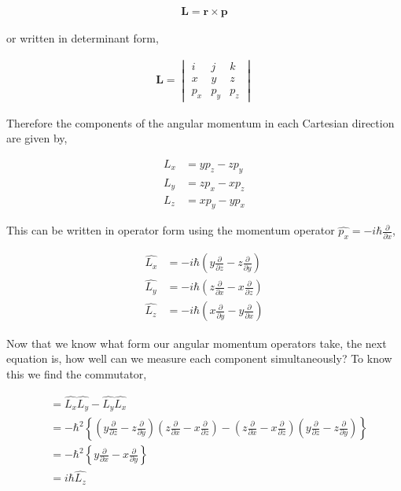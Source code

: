 \documentclass[11pt]{amsart}
\begin{document}
\begin{align*}
  \mathbf{L} = \mathbf{r}\times\mathbf{p}
\end{align*}

or written in determinant form,

\begin{align*}
  \mathbf{L} =
  \begin{vmatrix}
    i & j & k \\
    x & y & z \\
    p_x & p_y & p_z
  \end{vmatrix}
\end{align*}

Therefore the components of the angular momentum in each Cartesian direction are given by,

\begin{align*}
  L_x &= yp_z - zp_y \\
  L_y &= zp_x - xp_z \\
  L_z &= xp_y - yp_x
\end{align*}

This can be written in operator form using the momentum operator $\hat{p_x} = -i\hbar\frac{\partial}{\partial x}$,

\begin{align*}
  \hat{L_x} &= -i\hbar\left(y\frac{\partial}{\partial z}-z\frac{\partial}{\partial y}\right) \\
  \hat{L_y} &= -i\hbar\left(z\frac{\partial}{\partial x}-x\frac{\partial}{\partial z}\right) \\
  \hat{L_z} &= -i\hbar\left(x\frac{\partial}{\partial y}-y\frac{\partial}{\partial x}\right)
\end{align*}

Now that we know what form our angular momentum operators take, the next equation is, how well can we measure each component simultaneously? To know this we find the commutator,

\begin{align*}
  [\hat{L_x}, \hat{L_y}] &= \hat{L_x}\hat{L_y} - \hat{L_y}\hat{L_x} \\
                         &= -\hbar^2\left\{\left(y\frac{\partial}{\partial z}-z\frac{\partial}{\partial y}\right)\left(z\frac{\partial}{\partial x}-x\frac{\partial}{\partial z}\right)-\left(z\frac{\partial}{\partial x}-x\frac{\partial}{\partial z}\right)\left(y\frac{\partial}{\partial z}-z\frac{\partial}{\partial y}\right)\right\} \\
                         &= -\hbar^2\left\{y\frac{\partial}{\partial x}-x\frac{\partial}{\partial y}\right\} \\
                         &= i\hbar\hat{L_z}
\end{align*}
\end{document}
